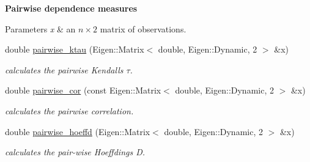 \begin{Indent}{\bf Pairwise dependence measures}\par
{\em 
\begin{DoxyParams}{Parameters}
{\em x} & an $ n \times 2 $ matrix of observations. \\
\hline
\end{DoxyParams}
}\begin{DoxyCompactItemize}
\item 
double \hyperlink{namespacetools__stats_aba1c21a7a90e6fefb3d92876469f401e}{pairwise\+\_\+ktau} (Eigen\+::\+Matrix$<$ double, Eigen\+::\+Dynamic, 2 $>$ \&x)\hypertarget{namespacetools__stats_aba1c21a7a90e6fefb3d92876469f401e}{}\label{namespacetools__stats_aba1c21a7a90e6fefb3d92876469f401e}

\begin{DoxyCompactList}\small\item\em calculates the pairwise Kendall\textquotesingle{}s $ \tau $. \end{DoxyCompactList}\item 
double \hyperlink{namespacetools__stats_ada062011e2c2a18d7258a39ad0722b7e}{pairwise\+\_\+cor} (const Eigen\+::\+Matrix$<$ double, Eigen\+::\+Dynamic, 2 $>$ \&x)\hypertarget{namespacetools__stats_ada062011e2c2a18d7258a39ad0722b7e}{}\label{namespacetools__stats_ada062011e2c2a18d7258a39ad0722b7e}

\begin{DoxyCompactList}\small\item\em calculates the pairwise correlation. \end{DoxyCompactList}\item 
double \hyperlink{namespacetools__stats_a48cbea62b23e33bacaf08ed439c189ca}{pairwise\+\_\+hoeffd} (Eigen\+::\+Matrix$<$ double, Eigen\+::\+Dynamic, 2 $>$ \&x)\hypertarget{namespacetools__stats_a48cbea62b23e33bacaf08ed439c189ca}{}\label{namespacetools__stats_a48cbea62b23e33bacaf08ed439c189ca}

\begin{DoxyCompactList}\small\item\em calculates the pair-\/wise Hoeffding\textquotesingle{}s D. \end{DoxyCompactList}\end{DoxyCompactItemize}
\end{Indent}

